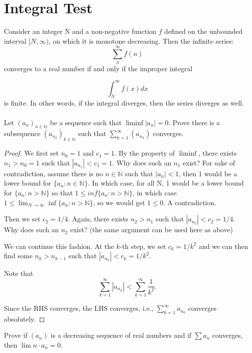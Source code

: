 \documentclass{notes}
\begin{document}
\section{Integral Test}

\begin{theorem}{}
	Consider an integer N and a non-negative function $f$ defined on the unbounded interval $ [N,\infty) $, on which it is monotone decreasing. Then the infinite series:
	$$ \sum_{n}^{\infty} f(n)$$
	converges to a real number if and only if the improper integral
	
	$$ \int_{N}^{\infty} f(x)dx$$
	is finite. In other words, if the integral diverges, then the series diverges as well.
\end{theorem}


\paragraph{}
\begin{problem}
	Let $(a_n)_{n \in \mathbb{N}}$  be a sequence such that $\liminf |a_n| = 0$. Prove there is
	a subsequence $ (a_{n_k})_{k \in \mathbb{N}} $ such that $\sum_{k = 1}^{\infty}(a_{n_k})$ converges.
\end{problem}
\begin{proof}
	We first set $n_0=1$ and $c_1=1$. By the property of $\liminf$, there exists $n_1>n_0=1$ such that $|a_{n_1}|<c_1=1$. Why does such an $n_1$ exist? For sake of contradiction, assume there is no $n \in \mathbb{N}$ such that $|a_n| < 1$, then 1 would be a lower
	bound for $\{a_n : n \in \mathbb{N}\}$. In which case, for all N, 1 would be a
	lower bound for $\{a_n : n > \mathbb{N}\}$ so that $1\leq  inf \{a_n : n > \mathbb{N}\}$, in
	which case $1 \leq \lim_{N\to\infty} \inf \{a_n : n > \mathbb{N}\}$, so we would get $1 \leq0$. A contradiction.
	
	Then we set $c_2=1/4$. Again, there exists $n_2>n_1$ such that $|a_{n_2}|<c_2=1/4$. Why does such an $n_2$ exist? (the same argument can be used here as above)
	
	We can continue this fashion. At the $k$-th step, we set $c_k=1/k^2$ and we can then find some $n_k>n_{k-1}$ such that $|a_{n_k}|<c_k=1/k^2$. 
	
	Note that 
	$$\sum_{k=1}^\infty{|a_{n_k}|}<\sum_{k=1}^\infty{\frac{1}{k^2}}.$$
	
	Since the RHS converges, the LHS converges, i.e., $\sum_{k=1}^\infty{a_{n_k}}$ converges absolutely. 
\end{proof}
\begin{problem}
	Prove if $(a_n)$ is a decreasing sequence of real numbers and if $\sum a_n$
	converges, then $\lim n\cdot a_n = 0$.
\end{problem}
\end{document}
